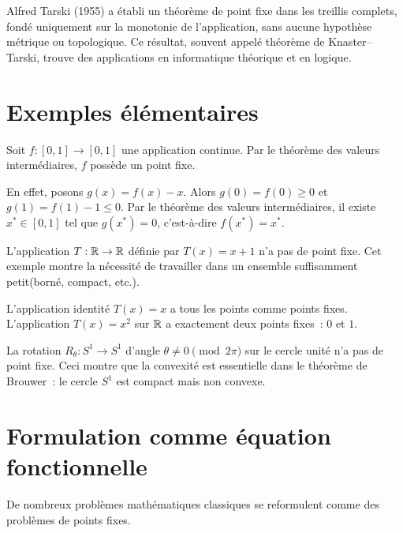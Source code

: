 Alfred Tarski (1955) a \'etabli un th\'eor\`eme de point fixe dans les treillis
complets, fond\'e uniquement sur la monotonie de l'application, sans aucune
hypoth\`ese m\'etrique ou topologique. Ce r\'esultat, souvent appel\'e
th\'eor\`eme de Knaster--Tarski, trouve des applications en informatique
th\'eorique et en logique.

\section{Exemples \'el\'ementaires}

\begin{exemple}
Soit $f : [0, 1] \to [0, 1]$ une application continue. Par le th\'eor\`eme des
valeurs interm\'ediaires, $f$ poss\`ede un point fixe.

En effet, posons $g(x) = f(x) - x$. Alors $g(0) = f(0) \geq 0$ et
$g(1) = f(1) - 1 \leq 0$. Par le th\'eor\`eme des valeurs interm\'ediaires,
il existe $x^* \in [0,1]$ tel que $g(x^*) = 0$, c'est-\`a-dire $f(x^*) = x^*$.
\end{exemple}

\begin{exemple}
L'application $T : \mathbb{R} \to \mathbb{R}$ d\'efinie par $T(x) = x + 1$ n'a pas de point fixe.
Cet exemple montre la n\'ecessit\'e de travailler dans un ensemble
\og{}suffisamment petit\fg (born\'e, compact, etc.).
\end{exemple}

\begin{exemple}
L'application identit\'e $T(x) = x$ a tous les points comme points fixes.
L'application $T(x) = x^2$ sur $\mathbb{R}$ a exactement deux points fixes~: $0$ et $1$.
\end{exemple}

\begin{exemple}
La rotation $R_\theta : S^1 \to S^1$ d'angle $\theta \neq 0 \pmod{2\pi}$ sur le
cercle unit\'e n'a pas de point fixe. Ceci montre que la convexit\'e est essentielle
dans le th\'eor\`eme de Brouwer~: le cercle $S^1$ est compact mais non convexe.
\end{exemple}

\section{Formulation comme \'equation fonctionnelle}

De nombreux probl\`emes math\'ematiques classiques se reformulent comme des
probl\`emes de points fixes.

